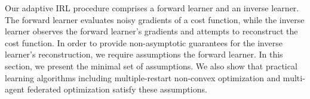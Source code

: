 \documentclass[journal,onecolumn]{IEEEtran}
\begin{document}

Our adaptive IRL procedure comprises a forward learner and an inverse learner. The forward learner evaluates noisy gradients of a cost function, while the inverse learner observes the forward learner’s gradients and attempts to reconstruct the cost function. In order to provide non-asymptotic guarantees for the inverse learner’s reconstruction, we require assumptions the forward learner. In this section, we present the minimal set of assumptions. We also show that practical learning algorithms including multiple-restart non-convex optimization and multi-agent federated optimization satisfy these assumptions. 
\end{document}
